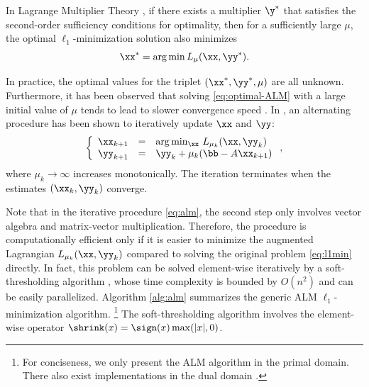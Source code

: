 In Lagrange Multiplier Theory \cite{BertsekasD2003}, if there exists a multiplier $\y^*$ that
satisfies the second-order sufficiency conditions for optimality, then for a sufficiently large $\mu$, the optimal
$\ell_1$-minimization solution also minimizes
\begin{equation}
\xx^* = \arg \min L_\mu(\xx,\yy^*).
\label{eq:optimal-ALM}
\end{equation}

In practice, the optimal values for the triplet $(\xx^*, \yy^*, \mu)$ are all
unknown. Furthermore, it has been observed that solving
\eqref{eq:optimal-ALM} with a large initial value of $\mu$ tends to lead to
slower convergence speed \cite{WrightS2008,YangA2010-ICIP}. In
\cite{BertsekasD2003,YangJ2009}, an alternating procedure has been shown to
iteratively update $\xx$ and $\yy$:
\begin{equation}
\left \{
\begin{array}{lll}
\xx_{k+1} & = & \arg\min_{\xx} \, L_{\mu_k} (\xx,\yy_k)\\
\yy_{k+1} & = & \yy_k + \mu_k (\bb - A\xx_{k+1}) \\
\end{array}
\right . ,
\label{eq:alm}
\end{equation}
where $\mu_{k}\rightarrow \infty$ increases monotonically.
The iteration terminates when the estimates $(\xx_k, \yy_k)$ converge.

Note that in the iterative procedure \eqref{eq:alm}, the second
step only involves vector algebra and matrix-vector multiplication. Therefore,
the procedure is computationally efficient only if it is easier to minimize the
augmented Lagrangian $L_{\mu_k} (\xx,\yy_k)$ compared to solving the original problem
\eqref{eq:l1min} directly. In fact, this problem can be solved element-wise
iteratively by a soft-thresholding algorithm \cite{WrightS2008,BeckA2009},
whose time complexity is bounded by $O(n^2)$ and can be easily parallelized.
Algorithm \ref{alg:alm} summarizes the generic ALM $\ell_1$-minimization algorithm. \footnote{For conciseness, we
only present the ALM algorithm in the primal domain. There also
exist implementations in the dual domain \cite{YangJ2009,YangA2010-ICIP}.}
The soft-thresholding algorithm involves the element-wise operator $\shrink(x) = \sign(x)\max(|x|,0)$.

